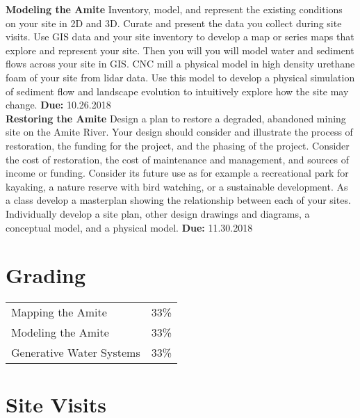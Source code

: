 \documentclass[11pt,article,oneside]{memoir}
\begin{document}
\noindent \textbf{Modeling the Amite}
Inventory, model, and represent the existing conditions
on your site in 2D and 3D.
Curate and present the data you collect during site visits.
Use GIS data and your site inventory
to develop a map or series maps that explore and represent your site.
Then you will you will model water and sediment flows across your site in GIS.
CNC mill a physical model in high density urethane foam
of your site from lidar data.
Use this model to develop a physical simulation of sediment flow
and landscape evolution to intuitively explore how the site may change.
\textbf{Due:} 10.26.2018 \\

\noindent \textbf{Restoring the Amite}
Design a plan to restore a degraded, abandoned mining site
on the Amite River.
Your design should consider and illustrate the process of restoration,
the funding for the project, and the phasing of the project.
Consider the cost of restoration, the cost of maintenance and management,
and sources of income or funding.
Consider its future use as for example
a recreational park for kayaking,
a nature reserve with bird watching,
or a sustainable development.
As a class develop a masterplan showing the relationship
between each of your sites.
Individually develop a site plan, other design drawings and diagrams,
a conceptual model, and a physical model.
\textbf{Due:} 11.30.2018 \\

\section{Grading}
%
\begin{table}[H]
\begin{tabular}{l r}
%
Mapping the Amite & 33\% \\
Modeling the Amite & 33\% \\
Generative Water Systems & 33\% \\
%
\end{tabular}
\end{table}

\clearpage

\section{Site Visits}
\end{document}
